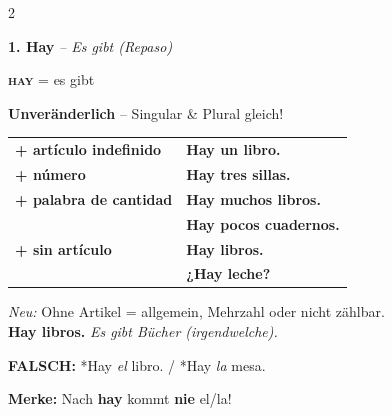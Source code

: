 \documentclass[11pt, a4paper]{article}
\newcommand{\seriftext}[1]{{\fontfamily{ppl}\selectfont #1}}
\newcommand{\es}[1]{\seriftext{\textbf{#1}}}
\newcommand{\de}[1]{\textit{\textcolor{akzent}{#1}}}
\newcommand{\gram}[1]{\textsc{#1}}
\newcommand{\abschnitt}[2]{\noindent\textbf{\large #1. #2}}
\begin{document}
\begin{multicols}{2}

\abschnitt{1}{Hay} \de{-- Es gibt (Repaso)}

\vspace{4pt}

\begin{grammatikbox}
\textbf{\gram{hay}} = es gibt

\vspace{4pt}

\textbf{Unveränderlich} -- Singular \& Plural gleich!

\vspace{6pt}

{\small
\begin{tabular}{@{}p{3.8cm}l@{}}
\textbf{+ artículo indefinido} & \es{Hay \textbf{un} libro.} \\[0.3em]
\textbf{+ número} & \es{Hay \textbf{tres} sillas.} \\[0.3em]
\textbf{+ palabra de cantidad} & \es{Hay \textbf{muchos} libros.} \\
 & \es{Hay \textbf{pocos} cuadernos.} \\[0.3em]
\textbf{+ sin artículo} & \es{Hay \textbf{libros}.} \\
 & \es{¿Hay \textbf{leche}?} \\
\end{tabular}}
\end{grammatikbox}

\vspace{4pt}

\begin{tippbox}
\footnotesize\textit{Neu:} Ohne Artikel = allgemein, Mehrzahl oder nicht zählbar.\\
\es{Hay libros.} \de{Es gibt Bücher (irgendwelche).}
\end{tippbox}

\vspace{4pt}

\begin{fehlerbox}
{\small\textbf{FALSCH:} \textcolor{colorrojo}{*Hay \textit{el} libro.} / \textcolor{colorrojo}{*Hay \textit{la} mesa.}

\vspace{2pt}

\textbf{Merke:} Nach \es{hay} kommt \textbf{nie} el/la!}
\end{fehlerbox}


\end{multicols}
\end{document}
